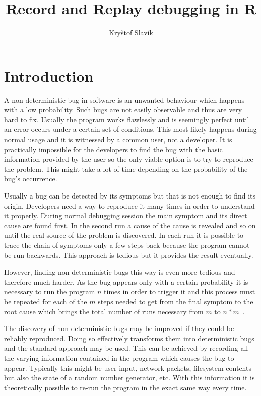 \documentclass[thesis=M,english,hidelinks]{FITthesis}[2012/10/20]
\title{Record and Replay debugging in R}
\author{Kryštof Slavík} %
\begin{document}

\chapter{Introduction}\label{introduction}
\vspace{-10pt}
A non-deterministic bug in software is an unwanted behaviour which happens with a low probability. Such bugs are not easily observable and thus are very hard to fix. Usually the program works flawlessly and is seemingly perfect until an error occurs under a certain set of conditions. This most likely happens during normal usage and it is witnessed by a common user, not a developer. It is practically impossible for the developers to find the bug with the basic information provided by the user so the only viable option is to try to reproduce the problem. This might take a lot of time depending on the probability of the bug's occurrence.\par

Usually a bug can be detected by its symptoms but that is not enough to find its origin. Developers need a way to reproduce it many times in order to understand it properly. During normal debugging session the main symptom and its direct cause are found first. In the second run a cause of the cause is revealed and so on until the real source of the problem is discovered. In each run it is possible to trace the chain of symptoms only a few steps back because the program cannot be run backwards. This approach is tedious but it provides the result eventually.\par

However, finding non-deterministic bugs this way is even more tedious and therefore much harder. As the bug appears only with a certain probability it is necessary to run the program $n$ times in order to trigger it and this process must be repeated for each of the $m$ steps needed to get from the final symptom to the root cause which brings the total number of runs necessary from $m$ to $n*m$~\cite{fitzgerald}.\par

The discovery of non-deterministic bugs may be improved if they could be reliably reproduced. Doing so effectively transforms them into deterministic bugs and the standard approach may be used. This can be achieved by recording all the varying information contained in the program which causes the bug to appear. Typically this might be user input, network packets, filesystem contents but also the state of a random number generator, etc. With this information it is theoretically possible to re-run the program in the exact same way every time.\par
\end{document}
